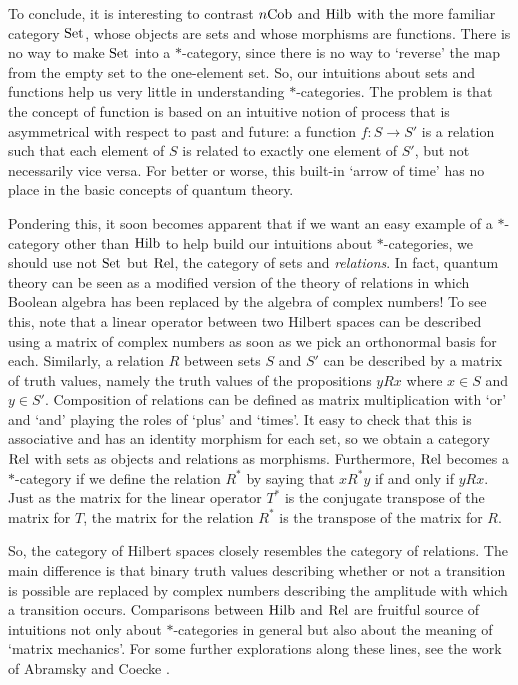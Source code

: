 \documentclass{article}
\newcommand{\Set}{{\rm Set}}
\newcommand{\Rel}{{\rm Rel}}
\newcommand{\Hilb}{{\rm Hilb}}
\newcommand{\Cob}{{\rm Cob}}
\renewcommand{\to}{\rightarrow}
\newcommand{\maps}{\colon}
\begin{document}
To conclude, it is interesting to contrast $n\Cob$ and $\Hilb$ with
the more familiar category $\Set$, whose objects are sets and whose
morphisms are functions.  There is no way to make $\Set$ into a
$\ast$-category, since there is no way to `reverse' the map from the
empty set to the one-element set.  So, our intuitions about sets and
functions help us very little in understanding $\ast$-categories.  The
problem is that the concept of function is based on an intuitive
notion of process that is asymmetrical with respect to past and
future: a function $f \maps S \to S'$ is a relation such that each
element of $S$ is related to exactly one element of $S'$, but not
necessarily vice versa.  For better or worse, this built-in `arrow of
time' has no place in the basic concepts of quantum theory.

Pondering this, it soon becomes apparent that if we want an easy 
example of a $\ast$-category other than $\Hilb$ to help build our 
intuitions about $\ast$-categories, we should use not $\Set$ but 
$\Rel$, the category of sets and {\it relations}.  In fact, quantum 
theory can be seen as a modified version of the theory of relations in 
which Boolean algebra has been replaced by the algebra of complex 
numbers!  To see this, note that a linear operator between two Hilbert 
spaces can be described using a matrix of complex numbers as soon as we 
pick an orthonormal basis for each.  Similarly, a relation $R$ between 
sets $S$ and $S'$ can be described by a matrix of truth values, 
namely the truth values of the propositions $yRx$ where $x \in S$
and $y \in S'$.  Composition of relations can be defined as matrix 
multiplication with `or' and `and' playing the roles of `plus' and 
`times'.  It easy to check that this is associative and has an
identity morphism for each set, so we obtain a category $\Rel$ with 
sets as objects and relations as morphisms.  Furthermore, $\Rel$ 
becomes a $\ast$-category if we define the relation $R^\ast$ by saying 
that $xR^\ast y$ if and only if $yRx$.  Just as the matrix for the linear 
operator $T^\ast$ is the conjugate transpose of the matrix for $T$, the 
matrix for the relation $R^\ast$ is the transpose of the matrix for $R$.  

So, the category of Hilbert spaces closely resembles the category of
relations.  The main difference is that binary truth values describing
whether or not a transition is possible are replaced by complex
numbers describing the amplitude with which a transition occurs.
Comparisons between $\Hilb$ and $\Rel$ are fruitful source of
intuitions not only about $\ast$-categories in general but also about
the meaning of `matrix mechanics'.  For some further explorations
along these lines, see the work of Abramsky and Coecke \cite{AC}.
\end{document}
